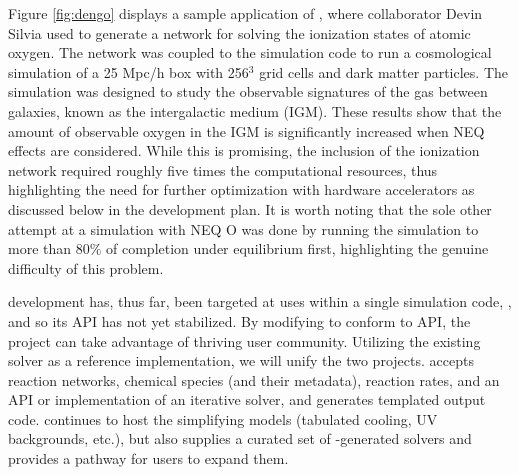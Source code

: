Figure \ref{fig:dengo} displays a sample application of \dengo{}, where
collaborator Devin Silvia used \dengo{} to generate a network for solving
the ionization states of atomic oxygen.  The network was coupled to
the \enzo{} simulation code to run a cosmological simulation of a 25
Mpc/h box with 256$^{3}$ grid cells and dark matter particles.  The
simulation was designed to study the observable signatures of the gas
between galaxies, known as the intergalactic medium (IGM).  These
results show that the amount of observable oxygen in the IGM is
significantly increased when NEQ effects are considered.
While this is promising, the inclusion of the ionization network
required roughly five times the computational resources, thus
highlighting the need for further optimization with hardware
accelerators as discussed below in the development plan.  It is worth
noting that the sole other attempt at a simulation with NEQ
O \citep{2016MNRAS.460.2157O} was done by running the
simulation to more than 80\% of completion under equilibrium first,
highlighting the genuine difficulty of this problem.

\dengo{} development has, thus far, been targeted at uses within a
single simulation code, \enzo{}, and so its API has not yet
stabilized.  By modifying \dengo{} to conform to  API, the
\dengo{} project can take advantage of  thriving user
community. Utilizing the existing \grackle{}
solver as a reference implementation, we will unify the two projects.
\dengo{} accepts reaction networks, chemical species (and their
metadata), reaction rates, and an API or implementation of an
iterative solver, and generates templated output code.  \grackle{}
continues to host the simplifying models (tabulated cooling, UV
backgrounds, etc.), but also supplies a curated set of
\dengo{}-generated solvers and provides a pathway for users to expand
them.

